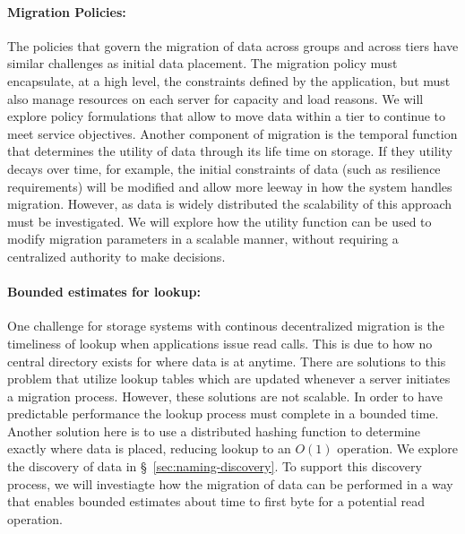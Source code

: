 \paragraph{Migration Policies:}
The policies that govern the migration of data across groups and across
tiers have similar challenges as initial data placement. The migration
policy must encapsulate, at a high level, the constraints defined by the
application, but must also manage resources on each server for capacity and
load reasons. We will explore policy formulations that allow \Sir to move
data within a tier to continue to meet service objectives. Another component
of migration is the temporal function that determines the utility of data
through its life time on storage. If they utility decays over time, for
example, the initial constraints of data (such as resilience requirements)
will be modified and allow more leeway in how the system handles migration.
However, as data is widely distributed the scalability of this approach must
be investigated. 
We will explore how the utility function can be used to modify migration
parameters in a scalable manner, without requiring a centralized authority
to make decisions. 

\paragraph{Bounded estimates for lookup:}
One challenge for storage systems with continous decentralized migration is
the timeliness of lookup when applications issue read calls. This is due to
how no central directory exists for where data is at anytime. There are
solutions to this problem that utilize lookup tables which are updated
whenever a server initiates a migration process. However, these solutions
are not scalable. In order to have predictable performance the lookup
process must complete in a bounded time. Another solution here is to use a
distributed hashing function to determine exactly where data is placed,
reducing lookup to an $O(1)$ operation. We explore the discovery of data in
\S~\ref{sec:naming-discovery}. To support this discovery process, we will
investiagte how the migration of data can be performed in a way that enables
bounded estimates about time to first byte for a potential read operation.



